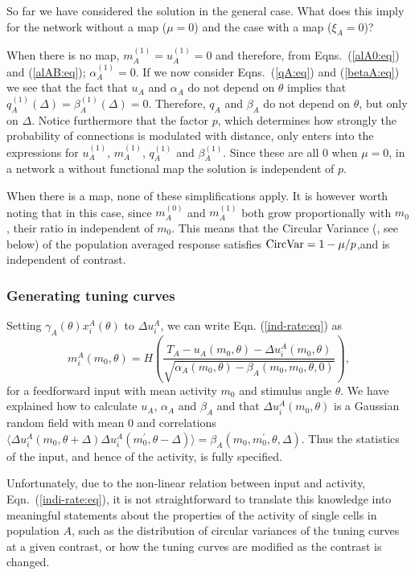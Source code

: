 So far we have considered the solution in the general case. What does this
imply for the network without a map ($\mu=0$) and the case with a map ($\xi_A=0$)?

When there is no map, 
$m_A^{(1)}=u_A^{(1)}=0$ and therefore, from Eqns.~(\ref{alA0:eq}) and 
(\ref{alAB:eq});
$\alpha_A^{(1)}=0$\@. If we now consider Eqns.~(\ref{qA:eq}) and 
(\ref{betaA:eq}) we see that the fact that $u_A$ and $\alpha_A$ do not depend 
on $\theta$ implies that $q_A^{(1)}(\Delta)=\beta_A^{(1)}(\Delta)=0$\@. 
Therefore, $q_A$ and $\beta_A$ do not depend on $\theta$, but only 
on $\Delta$\@. Notice furthermore
that the factor $p$, which determines how strongly the probability of 
connections is modulated with distance, only enters into the expressions for
$u_A^{(1)}$, $m_A^{(1)}$, $q_A^{(1)}$ and $\beta_A^{(1)}$\@. Since these are 
all 0 when $\mu=0$, in a network a without functional map the solution is
independent of $p$\@.

When there is a map, none of these simplifications apply. It is 
however worth noting that in this case, since $m_A^{(0)}$ and $m_A^{(1)}$
both grow proportionally with $m_0$, their ratio in independent of $m_0$\@.
This means that the Circular Variance (\CircVar, see below) of the population
averaged response satisfies $\text{CircVar}=1-\mu/p$,and is independent of contrast.

\subsubsection*{Generating tuning curves}
Setting $\gamma_A(\theta)x_i^A(\theta)$ to $\Delta u_i^A$, we can
write Eqn. (\ref{ind-rate:eq}) as
\begin{equation}
m_i^A(m_0,\theta)=H\left(\frac{T_A-u_A(m_0,\theta)-\Delta u_i^A(m_0,\theta)}
{\sqrt{\alpha_A(m_0,\theta)-\beta_A(m_0,m_0,\theta,0)}}\right),
\label{indi-rate:eq}
\end{equation}
for a feedforward input with mean activity $m_0$ and stimulus angle $\theta$\@.
We have explained how to calculate $u_A$, $\alpha_A$ and $\beta_A$ and that
$\Delta u_i^A(m_0,\theta)$ is a Gaussian random field with
mean 0 and correlations $\langle \Delta u_i^A(m_0,\theta+\Delta)
\Delta u_i^A(m_0^\prime,\theta-\Delta)\rangle=
\beta_{A}(m_0,m_0^\prime,\theta,\Delta)$\@. Thus the statistics of the input, 
and hence of the activity, is fully specified. 

Unfortunately, due to the 
non-linear relation between input and activity, Eqn.~(\ref{indi-rate:eq}),
it is not straightforward to translate this knowledge into meaningful
statements about the properties of the activity of single cells in population 
$A$, such as the distribution of circular variances of the tuning curves at
a given contrast, or how the tuning curves are modified as the contrast is 
changed. 

